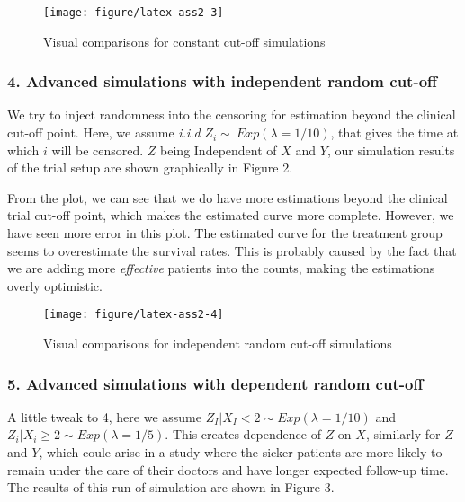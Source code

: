 \documentclass{article}\usepackage{graphicx, color}
\makeatletter
\def\maxwidth{ %
  \ifdim\Gin@nat@width>\linewidth
    \linewidth
  \else
    \Gin@nat@width
  \fi
}
\newenvironment{knitrout}{}{} %
\makeatother
\begin{document}
\begin{knitrout}
\color{fgcolor}\begin{figure}[]


{\centering \texttt{[image: figure/latex-ass2-3]} 

}

\caption[Visual comparisons for constant cut-off simulations]{Visual comparisons for constant cut-off simulations\label{fig:ass2-3}}
\end{figure}


\end{knitrout}


\subsubsection*{4. Advanced simulations with independent random cut-off}
\hspace{12 pt} We try to inject randomness into the censoring for
estimation beyond the clinical cut-off point. Here, we assume
\textit{i.i.d} $Z_i \sim ~ Exp(\lambda = 1/10)$, that gives the time
at which $i$ will be censored. $Z$ being Independent of $X$ and $Y$, our
simulation results of the trial setup are shown graphically in Figure 2.


From the plot, we can see that we do have more estimations beyond the
clinical trial cut-off point, which makes the estimated curve more
complete. However, we have seen more error in this plot. The estimated
curve for the treatment group seems to overestimate the survival
rates. This is probably caused by the fact that we are adding more
\textit{effective} patients into the counts, making the estimations
overly optimistic.

\begin{knitrout}
\color{fgcolor}\begin{figure}[]


{\centering \texttt{[image: figure/latex-ass2-4]} 

}

\caption[Visual comparisons for independent random cut-off simulations]{Visual comparisons for independent random cut-off simulations\label{fig:ass2-4}}
\end{figure}


\end{knitrout}


\subsubsection*{5. Advanced simulations with dependent random cut-off}
\hspace{12 pt} A little tweak to 4, here we assume 
$Z_I|X_I < 2 \sim Exp(\lambda = 1/10)$ and $Z_i|X_i \geq 2 \sim Exp(\lambda = 1/5)$. \newline
This creates dependence of $Z$ on $X$, similarly for $Z$ and $Y$,
which coule arise in a study where the sicker patients are more likely
to remain under the care of their doctors and have longer expected
follow-up time. The results of this run of simulation are shown in
Figure 3.
\end{document}
